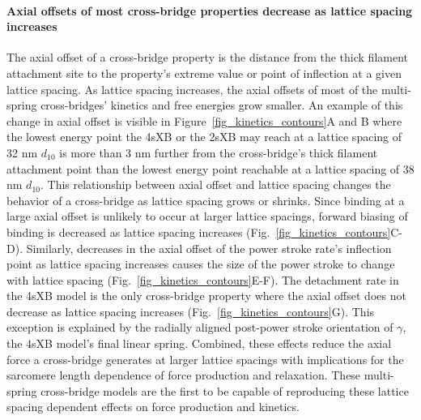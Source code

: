 \documentclass[10pt]{article}
\begin{document}
\paragraph{Axial offsets of most cross-bridge properties decrease as lattice spacing increases} %
The axial offset of a cross-bridge property is the distance from the thick filament attachment site to the property's extreme value or point of inflection at a given lattice spacing. 
As lattice spacing increases, the axial offsets of most of the multi-spring cross-bridges' kinetics and free energies grow smaller.
An example of this change in axial offset is visible in Figure~\ref{fig_kinetics_contours}A and B where the lowest energy point the 4sXB or the 2sXB may reach at a lattice spacing of 32 nm $d_{10}$ is more than 3 nm further from the cross-bridge's thick filament attachment point than the lowest energy point reachable at a lattice spacing of 38 nm $d_{10}$. 
This relationship between axial offset and lattice spacing changes the behavior of a cross-bridge as lattice spacing grows or shrinks.
Since binding at a large axial offset is unlikely to occur at larger lattice spacings, forward biasing of binding is decreased as lattice spacing increases (Fig.~\ref{fig_kinetics_contours}C-D). 
Similarly, decreases in the axial offset of the power stroke rate's inflection point as lattice spacing increases causes the size of the power stroke to change with lattice spacing (Fig.~\ref{fig_kinetics_contours}E-F).
The detachment rate in the 4sXB model is the only cross-bridge property where the axial offset does not decrease as lattice spacing increases (Fig.~\ref{fig_kinetics_contours}G). 
This exception is explained by the radially aligned post-power stroke orientation of $\gamma$, the 4sXB model's final linear spring. 
Combined, these effects reduce the axial force a cross-bridge generates at larger lattice spacings with implications for the sarcomere length dependence of force production and relaxation. 
These multi-spring cross-bridge models are the first to be capable of reproducing these lattice spacing dependent effects on force production and kinetics.
\end{document}
